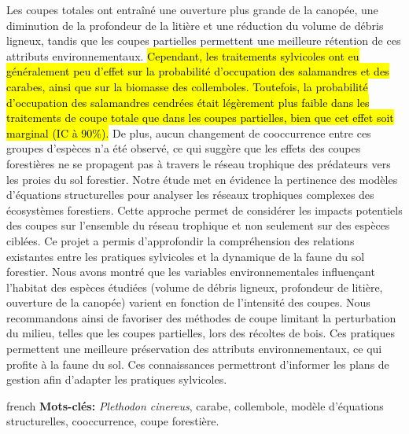 Les coupes totales ont entraîné une ouverture plus grande de la canopée, une diminution de la profondeur de la litière et une réduction du volume de débris ligneux, 
tandis que les coupes partielles permettent une meilleure rétention de ces attributs environnementaux. 
\hl{Cependant, les traitements sylvicoles ont eu généralement peu d’effet sur la probabilité d’occupation des salamandres et des carabes, ainsi que sur la biomasse des collemboles. 
Toutefois, la probabilité d’occupation des salamandres cendrées était légèrement plus faible dans les traitements de coupe totale que dans les coupes partielles, bien que cet effet soit marginal (IC à 90\%).}
De plus, aucun changement de cooccurrence entre ces groupes d’espèces n’a été observé, ce qui suggère que les effets des coupes forestières ne se propagent pas à travers le réseau trophique des prédateurs vers les proies du sol forestier. 
Notre étude met en évidence la pertinence des modèles d’équations structurelles pour analyser les réseaux trophiques complexes des écosystèmes forestiers. 
Cette approche permet de considérer les impacts potentiels des coupes sur l’ensemble du réseau trophique et non seulement sur des espèces ciblées. 
Ce projet a permis d’approfondir la compréhension des relations existantes entre les pratiques sylvicoles et la dynamique de la faune du sol forestier. 
Nous avons montré que les variables environnementales influençant l’habitat des espèces étudiées (volume de débris ligneux, profondeur de litière, ouverture de la canopée) varient en fonction de l’intensité des coupes. 
Nous recommandons ainsi de favoriser des méthodes de coupe limitant la perturbation du milieu, telles que les coupes partielles, lors des récoltes de bois. 
Ces pratiques permettent une meilleure préservation des attributs environnementaux, ce qui profite à la faune du sol. 
Ces connaissances permettront d’informer les plans de gestion afin d’adapter les pratiques sylvicoles.


\begin{otherlanguage*}{french}
\textbf{Mots-clés:} \textit{Plethodon cinereus}, carabe, collembole, modèle d'équations structurelles, cooccurrence, coupe forestière.
\end{otherlanguage*}
